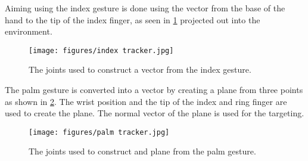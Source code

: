 Aiming using the index gesture is done using the vector from the base of the hand to the tip of the index finger, as seen in \ref{fig:indexTracker} projected out into the environment. 

\begin{figure}[!ht]
    \centering
    \texttt{[image: figures/index tracker.jpg]}
    \caption{The joints used to construct a vector from the index gesture.}
    \label{fig:indexTracker}
\end{figure}

The palm gesture is converted into a vector by creating a plane from three points as shown in \ref{fig:palmTracker}. The wrist position and the tip of the index and ring finger are used to create the plane. The normal vector of the plane is used for the targeting.
\begin{figure}[!ht]
    \centering
    \texttt{[image: figures/palm tracker.jpg]}
    \caption{The joints used to construct and plane from the palm gesture.}
    \label{fig:palmTracker}
\end{figure}





